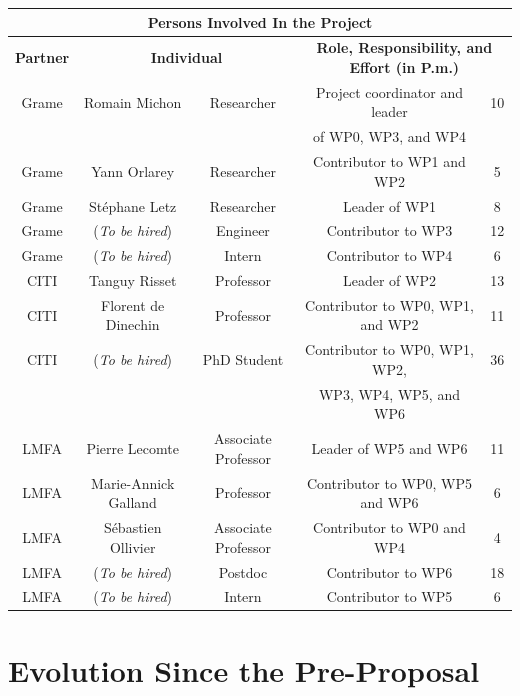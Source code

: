\documentclass[a4paper,9pt]{extarticle}
\author{\hline \textbf{Partners} \\ Grame -- Centre National de Création Musicale (CNCM) \\ CITI -- Institut National de Sciences Appliquées de Lyon (INSA) \\ LMFA -- École Centrale de Lyon \vspace{0.3cm} \\ \textbf{Coordinator} \\ Romain Michon, GRAME-CNCM, Lyon \\ \href{mailto:michon@grame.fr}{\texttt{michon@grame.fr}} \hspace{0.8cm} \url{https://ccrma.stanford.edu/~rmichon}\\ \hline
}
\title{\vspace{-\baselineskip}\Huge{}\mytitle}
\date{PRC -- Full Proposal\\Domaines transversaux\\
CE38 (Axe 8.6.) Révolution numérique : rapports au savoir et à la culture \vspace{\baselineskip} \\ \textbf{Keywords:} Approche numérique à la création artistique, Traitement audio-numérique ultra-basse latence, Programmation de haut niveau, Acoustique virtuelle \\}
\begin{document}
\maketitle
\thispagestyle{fancy}

\begin{center}
\begin{tabular}{c | c c | c | c}
\multicolumn{5}{c}{\textbf{Persons Involved In the Project}}\\
\hline
\hline
\textbf{Partner} & \multicolumn{2}{c|}{\textbf{Individual}} & \multicolumn{2}{c}{\textbf{Role, Responsibility, and Effort (in P.m.)}} \\
\hline
Grame & Romain Michon & Researcher & Project coordinator and leader & 10 \\ 
& & & of WP0, WP3, and WP4 \\
\hline
Grame & Yann Orlarey & Researcher & Contributor to WP1 and WP2 & 5 \\
\hline
Grame & Stéphane Letz & Researcher & Leader of WP1 & 8 \\
\hline
Grame & (\textit{To be hired}) & Engineer & Contributor to WP3 & 12 \\
\hline
Grame & (\textit{To be hired}) & Intern & Contributor to WP4 & 6 \\
\hline
CITI & Tanguy Risset & Professor & Leader of WP2 & 13 \\
\hline
CITI & Florent de Dinechin & Professor & Contributor to WP0, WP1, and WP2 & 11 \\
\hline
CITI & (\textit{To be hired}) & PhD Student & Contributor to WP0, WP1, WP2, & 36 \\ 
& & & WP3, WP4, WP5, and WP6 \\
\hline
LMFA & Pierre Lecomte & Associate Professor & Leader of WP5 and WP6 & 11 \\
\hline
LMFA & Marie-Annick Galland & Professor & Contributor to WP0, WP5 and WP6 & 6 \\
\hline
LMFA & Sébastien Ollivier & Associate Professor & Contributor to WP0 and WP4 & 4 \\
\hline
LMFA & (\textit{To be hired}) & Postdoc & Contributor to WP6 & 18 \\ 
\hline
LMFA & (\textit{To be hired}) & Intern & Contributor to WP5 & 6 \\
\end{tabular}
\end{center}


\section*{Evolution Since the Pre-Proposal}
\end{document}
